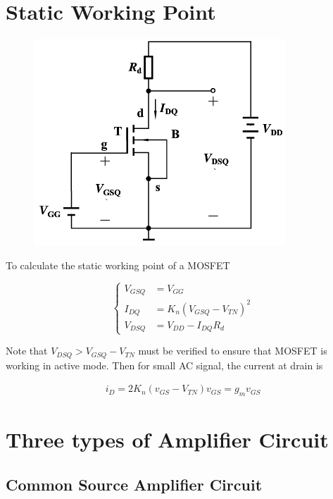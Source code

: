 \section{Static Working Point}

\begin{figure}[H]
  \centering
  \includegraphics[width=0.5\linewidth]{figures/MOSFET-Static}
  \label{fig:}
\end{figure}

To calculate the static working point of a MOSFET

\begin{equation*}
  \left\{
  \begin{aligned}
    V_{GSQ} &= V_{GG} \\
    I_{DQ} &= K_n \left( V_{GSQ} - V_{TN} \right)^2 \\
    V_{DSQ} &= V_{DD} - I_{DQ} R_d
  \end{aligned}
  \right.
\end{equation*}

Note that $V_{DSQ} > V_{GSQ} - V_{TN}$ must be verified to ensure that MOSFET is working in active mode. Then for small AC signal, the current at drain is

\begin{equation*}
  \begin{aligned}
    i_D = 2 K_n \left( v_{GS} - V_{TN} \right) v_{GS} = g_m v_{GS}
  \end{aligned}
\end{equation*}

\section{Three types of Amplifier Circuit}

\subsection{Common Source Amplifier Circuit}

